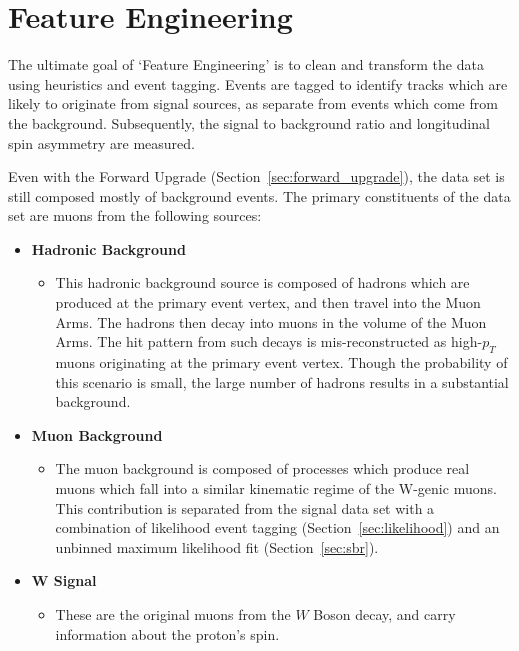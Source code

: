 \chapter{Feature Engineering}
\label{ch:feature_engineering}
The ultimate goal of `Feature Engineering' is to clean and transform the data
using heuristics and event tagging. Events are tagged to identify tracks which
are likely to originate from signal sources, as separate from events which come
from the background. Subsequently, the signal to background ratio and
longitudinal spin asymmetry are measured.

Even with the Forward Upgrade (Section~\ref{sec:forward_upgrade}), the data set
is still composed mostly of background events. The primary constituents of the
data set are muons from the following sources:

\begin{itemize}
  \item \textbf{Hadronic Background}
    \begin{itemize}
      \item This hadronic background source is composed of hadrons which are
        produced at the primary event vertex, and then travel into the Muon
        Arms. The hadrons then decay into muons in the volume of the Muon Arms.
        The hit pattern from such decays is mis-reconstructed as high-$p_T$
        muons originating at the primary event vertex. Though the probability of
        this scenario is small, the large number of hadrons results in a
        substantial background. 
    \end{itemize}
  \item \textbf{Muon Background}
    \begin{itemize}
        \item The muon background is composed of processes which produce real
          muons which fall into a similar kinematic regime of the W-genic muons.
          This contribution is separated from the signal data set with a
          combination of likelihood event tagging (Section~\ref{sec:likelihood})
          and an unbinned maximum likelihood fit (Section~\ref{sec:sbr}).
    \end{itemize}
  \item \textbf{W Signal}
    \begin{itemize}
        \item These are the original muons from the $W$ Boson decay, and carry
          information about the proton's spin.
    \end{itemize}
\end{itemize}

